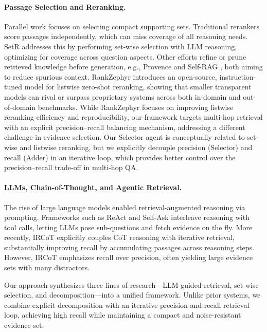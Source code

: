 \documentclass{article} %
\begin{document}
\paragraph{Passage Selection and Reranking.} Parallel work focuses on selecting compact supporting sets. Traditional rerankers score passages independently, which can miss coverage of all reasoning needs. SetR \citep{lee-etal-2025-shifting} addresses this by performing set-wise selection with LLM reasoning, optimizing for coverage across question aspects. Other efforts refine or prune retrieved knowledge before generation, e.g., Provence \citep{chirkova2025provence} and Self-RAG \citep{asai2023selfrag}, both aiming to reduce spurious context. RankZephyr \citep{pradeep2023rankzephyr} introduces an open-source, instruction-tuned model for listwise zero-shot reranking, showing that smaller transparent models can rival or surpass proprietary systems across both in-domain and out-of-domain benchmarks. While RankZephyr focuses on improving listwise reranking efficiency and reproducibility, 
our framework targets multi-hop retrieval with an explicit precision–recall balancing mechanism, addressing a different challenge in evidence selection.  Our Selector agent is conceptually related to set-wise and listwise reranking, but we explicitly decouple precision (Selector) and recall (Adder) in an iterative loop, which provides better control over the precision–recall trade-off in multi-hop QA.


\paragraph{LLMs, Chain-of-Thought, and Agentic Retrieval.} The rise of large language models enabled retrieval-augmented reasoning via prompting. Frameworks such as ReAct \citep{yao2023react} and Self-Ask \citep{press2022measuring} interleave reasoning with tool calls, letting LLMs pose sub-questions and fetch evidence on the fly. More recently, IRCoT \citep{trivedi-etal-2023-interleaving} explicitly couples CoT reasoning with iterative retrieval, substantially improving recall by accumulating passages across reasoning steps. However, IRCoT emphasizes recall over precision, often yielding large evidence sets with many distractors. 

Our approach synthesizes three lines of research—LLM-guided retrieval, set-wise selection, and decomposition—into a unified framework. Unlike prior systems, we combine explicit decomposition with an iterative precision-and-recall retrieval loop, achieving high recall while maintaining a compact and noise-resistant evidence set.
\end{document}
